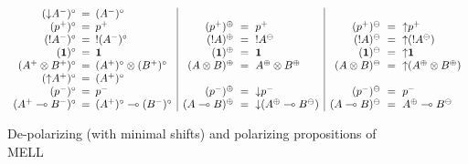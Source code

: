\begin{figure}
{\small \[
\begin{array}{rcl|rcl|rcl}
({\downarrow}A^-)^\circ & \!\!\!=\!\!\! & (A^-)^\circ & & & & & & 
\\
(p^+)^\circ & \!\!\!=\!\!\! & p^+ &
(p^+)^\oplus & \!\!\!=\!\!\! & p^+ &
(p^+)^\ominus & \!\!\!=\!\!\! & {\uparrow}p^+
\\
({!}A^-)^\circ & \!\!\!=\!\!\! & {!}(A^-)^\circ &
({!}A)^\oplus & \!\!\!=\!\!\! & {!}A^\ominus &
({!}A)^\ominus & \!\!\!=\!\!\! & {\uparrow}({!}A^\ominus)
\\
(\one)^\circ & \!\!\!=\!\!\! & \one &
(\one)^\oplus & \!\!\!=\!\!\! & \one &
(\one)^\ominus & \!\!\!=\!\!\! & {\uparrow}\one 
\\
(A^+ \otimes B^+)^\circ & \!\!\!=\!\!\! & (A^+)^\circ \otimes (B^+)^\circ &
(A \otimes B)^\oplus & \!\!\!=\!\!\! & A^\oplus \otimes B^\oplus &
(A \otimes B)^\ominus & \!\!\!=\!\!\! & {\uparrow}(A^\oplus \otimes B^\oplus)
\\
({\uparrow}A^+)^\circ & \!\!\!=\!\!\! & (A^+)^\circ & & & & & & 
\\
(p^-)^\circ & \!\!\!=\!\!\! & p^- &
(p^-)^\oplus & \!\!\!=\!\!\! & {\downarrow}p^- &
(p^-)^\ominus & \!\!\!=\!\!\! & p^- 
\\
(A^+ \lolli B^-)^\circ & \!\!\!=\!\!\! & (A^+)^\circ \lolli (B^-)^\circ &
(A \lolli B)^\oplus & \!\!\!=\!\!\! & {\downarrow}(A^\oplus \lolli B^\ominus) &
(A \lolli B)^\ominus & \!\!\!=\!\!\! & A^\oplus \lolli B^\ominus
\end{array}
\]}

\caption{De-polarizing (with minimal shifts) and polarizing propositions of MELL}
\label{fig:lin-shift}
\end{figure}
